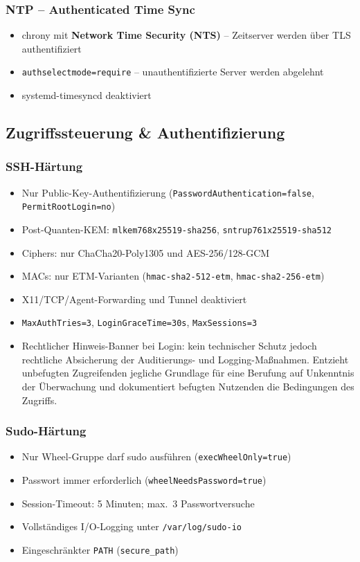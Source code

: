 \subsubsection*{NTP -- Authenticated Time Sync}
\begin{itemize}
  \item chrony mit \textbf{Network Time Security (NTS)} -- Zeitserver werden über TLS authentifiziert
  \item \texttt{authselectmode=require} -- unauthentifizierte Server werden abgelehnt
  \item systemd-timesyncd deaktiviert
\end{itemize}


\subsection{Zugriffssteuerung \& Authentifizierung}
\subsubsection*{SSH-Härtung}
\begin{itemize}
  \item Nur Public-Key-Authentifizierung (\texttt{PasswordAuthentication=false}, \texttt{PermitRootLogin=no})
  \item Post-Quanten-\ac{KEM}: \texttt{mlkem768x25519-sha256}, \texttt{sntrup761x25519-sha512}
  \item Ciphers: nur ChaCha20-Poly1305 und AES-256/128-GCM
  \item MACs: nur ETM-Varianten (\texttt{hmac-sha2-512-etm}, \texttt{hmac-sha2-256-etm})
  \item X11/\acs{TCP}/Agent-Forwarding und Tunnel deaktiviert
  \item \texttt{MaxAuthTries=3}, \texttt{LoginGraceTime=30s}, \texttt{MaxSessions=3}
  \item Rechtlicher Hinweis-Banner bei Login: kein technischer Schutz jedoch rechtliche Absicherung der Auditierungs- und Logging-Maßnahmen. Entzieht
  unbefugten Zugreifenden jegliche Grundlage für eine Berufung auf Unkenntnis der Überwachung und
  dokumentiert befugten Nutzenden die Bedingungen des Zugriffs.
\end{itemize}

\subsubsection*{Sudo-Härtung}
\begin{itemize}
  \item Nur Wheel-Gruppe darf sudo ausführen (\texttt{execWheelOnly=true})
  \item Passwort immer erforderlich (\texttt{wheelNeedsPassword=true})
  \item Session-Timeout: 5 Minuten; max.\ 3 Passwortversuche
  \item Vollständiges I/O-Logging unter \texttt{/var/log/sudo-io}
  \item Eingeschränkter \texttt{PATH} (\texttt{secure\_path})
\end{itemize}

